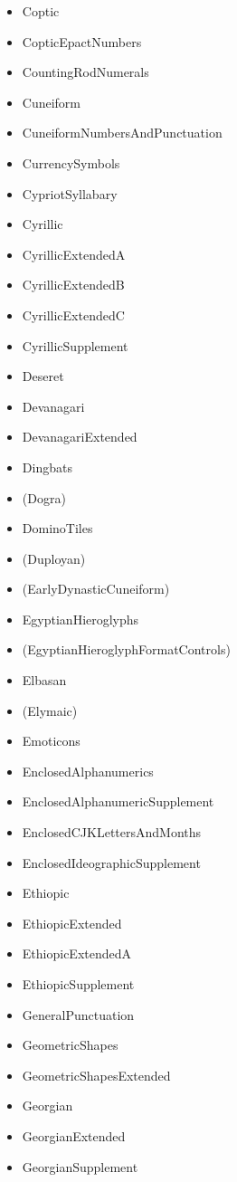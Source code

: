 \documentclass{article}
\newenvironment{itemlist}{%
  \begin{itemize}
	\setlength{\itemsep}{0pt}
	\setlength{\parsep}{0pt}
	\setlength{\topsep}{0pt}
	\setlength{\partopsep}{0pt}
	\setlength{\parskip}{0pt}
	\setlength{\labelsep}{5pt}}%
{
  \end{itemize}}
\begin{document}
\begin{multicols*}{2}
\begin{itemlist}
				\item Coptic
				\item CopticEpactNumbers
				\item CountingRodNumerals
				\item Cuneiform
				\item CuneiformNumbersAndPunctuation
				\item CurrencySymbols
				\item CypriotSyllabary
				\item Cyrillic
				\item CyrillicExtendedA
				\item CyrillicExtendedB
				\item CyrillicExtendedC
				\item CyrillicSupplement
				\item Deseret
				\item Devanagari
				\item DevanagariExtended
				\item Dingbats
				\item (Dogra)
				\item DominoTiles
				\item (Duployan)
				\item (EarlyDynasticCuneiform)
				\item EgyptianHieroglyphs
				\item (EgyptianHieroglyphFormatControls)
				\item Elbasan
				\item (Elymaic)
				\item Emoticons
				\item EnclosedAlphanumerics
				\item EnclosedAlphanumericSupplement
				\item EnclosedCJKLettersAndMonths
				\item EnclosedIdeographicSupplement
				\item Ethiopic
				\item EthiopicExtended
				\item EthiopicExtendedA
				\item EthiopicSupplement
				\item GeneralPunctuation
				\item GeometricShapes
				\item GeometricShapesExtended
				\item Georgian
				\item GeorgianExtended
				\item GeorgianSupplement

\end{itemlist}
\end{multicols*}
\end{document}
